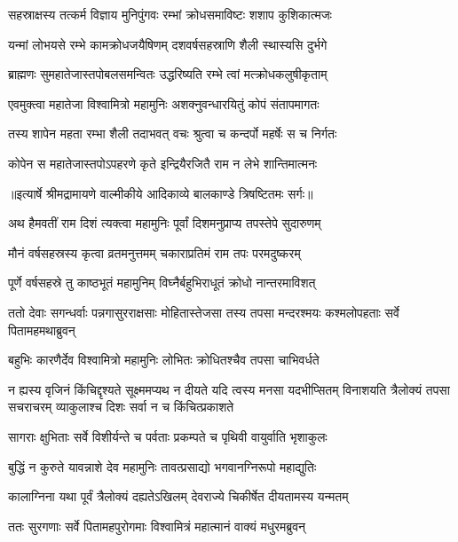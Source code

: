 \twolineshloka
{सहस्राक्षस्य तत्कर्म विज्ञाय मुनिपुंगवः}
{रम्भां क्रोधसमाविष्टः शशाप कुशिकात्मजः} %

\twolineshloka
{यन्मां लोभयसे रम्भे कामक्रोधजयैषिणम्}
{दशवर्षसहस्राणि शैली स्थास्यसि दुर्भगे} %

\twolineshloka
{ब्राह्मणः सुमहातेजास्तपोबलसमन्वितः}
{उद्धरिष्यति रम्भे त्वां मत्क्रोधकलुषीकृताम्} %

\twolineshloka
{एवमुक्त्वा महातेजा विश्वामित्रो महामुनिः}
{अशक्नुवन्धारयितुं कोपं संतापमागतः} %

\twolineshloka
{तस्य शापेन महता रम्भा शैली तदाभवत्}
{वचः श्रुत्वा च कन्दर्पो महर्षेः स च निर्गतः} %

\twolineshloka
{कोपेन स महातेजास्तपोऽपहरणे कृते}
{इन्द्रियैरजितै राम न लेभे शान्तिमात्मनः} %


{॥इत्यार्षे श्रीमद्रामायणे वाल्मीकीये आदिकाव्ये बालकाण्डे त्रिषष्टितमः सर्गः॥}


\twolineshloka
{अथ हैमवतीं राम दिशं त्यक्त्वा महामुनिः}
{पूर्वां दिशमनुप्राप्य तपस्तेपे सुदारुणम्} %

\twolineshloka
{मौनं वर्षसहस्रस्य कृत्वा व्रतमनुत्तमम्}
{चकाराप्रतिमं राम तपः परमदुष्करम्} %

\twolineshloka
{पूर्णे वर्षसहस्रे तु काष्ठभूतं महामुनिम्}
{विघ्नैर्बहुभिराधूतं क्रोधो नान्तरमाविशत्} %

\threelineshloka
{ततो देवाः सगन्धर्वाः पन्नगासुरराक्षसाः}
{मोहितास्तेजसा तस्य तपसा मन्दरश्मयः}
{कश्मलोपहताः सर्वे पितामहमथाब्रुवन्} %

\twolineshloka
{बहुभिः कारणैर्देव विश्वामित्रो महामुनिः}
{लोभितः क्रोधितश्चैव तपसा चाभिवर्धते} %

\fourlineshloka
{न ह्यस्य वृजिनं किंचिद्दृश्यते सूक्ष्ममप्यथ}
{न दीयते यदि त्वस्य मनसा यदभीप्सितम्}
{विनाशयति त्रैलोक्यं तपसा सचराचरम्}
{व्याकुलाश्च दिशः सर्वा न च किंचित्प्रकाशते} %

\twolineshloka
{सागराः क्षुभिताः सर्वे विशीर्यन्ते च पर्वताः}
{प्रकम्पते च पृथिवी वायुर्वाति भृशाकुलः} %

\twolineshloka
{बुद्धिं न कुरुते यावन्नाशे देव महामुनिः}
{तावत्प्रसाद्यो भगवानग्निरूपो महाद्युतिः} %

\twolineshloka
{कालाग्निना यथा पूर्वं त्रैलोक्यं दह्यतेऽखिलम्}
{देवराज्ये चिकीर्षेत दीयतामस्य यन्मतम्} %

\twolineshloka
{ततः सुरगणाः सर्वे पितामहपुरोगमाः}
{विश्वामित्रं महात्मानं वाक्यं मधुरमब्रुवन्} %

